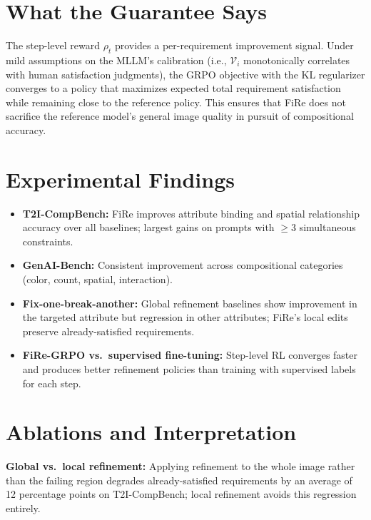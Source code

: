 \documentclass[10pt,twocolumn]{article}
\begin{document}
\section{What the Guarantee Says}

The step-level reward $\rho_t$ provides a per-requirement improvement signal.
Under mild assumptions on the MLLM's calibration (i.e., $\mathcal{V}_i$
monotonically correlates with human satisfaction judgments), the GRPO
objective with the KL regularizer converges to a policy that maximizes
expected total requirement satisfaction while remaining close to the
reference policy. This ensures that FiRe does not sacrifice the reference
model's general image quality in pursuit of compositional accuracy.

\section{Experimental Findings}

\begin{itemize}[itemsep=2pt,parsep=0pt]
  \item \textbf{T2I-CompBench:} FiRe improves attribute binding and spatial
    relationship accuracy over all baselines; largest gains on prompts with
    $\geq 3$ simultaneous constraints.
  \item \textbf{GenAI-Bench:} Consistent improvement across compositional
    categories (color, count, spatial, interaction).
  \item \textbf{Fix-one-break-another:} Global refinement baselines show
    improvement in the targeted attribute but regression in other attributes;
    FiRe's local edits preserve already-satisfied requirements.
  \item \textbf{FiRe-GRPO vs.\ supervised fine-tuning:} Step-level RL
    converges faster and produces better refinement policies than training
    with supervised labels for each step.
\end{itemize}

\section{Ablations and Interpretation}

\textbf{Global vs.\ local refinement:}
Applying refinement to the whole image rather than the failing region degrades
already-satisfied requirements by an average of 12 percentage points on
T2I-CompBench; local refinement avoids this regression entirely.
\end{document}
